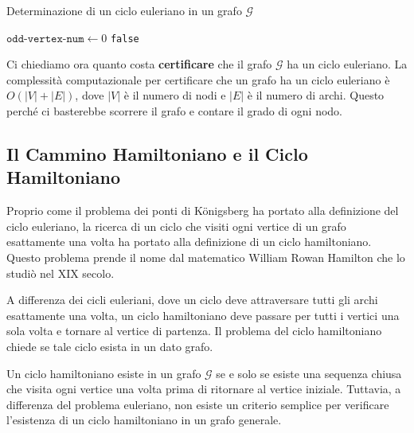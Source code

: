 \begin{algorithm}[H]
    \SetAlgoLined
    
    \DontPrintSemicolon
    \caption{Determinazione di un ciclo euleriano in un grafo $\mathcal{G}$}
    \label{alg:eulero_algo}
    
    
    \BlankLine
    $\texttt{odd-vertex-num} \gets 0$\;
    \Return \texttt{false}\;
\end{algorithm}

Ci chiediamo ora quanto costa \textbf{certificare} che il grafo $\mathcal{G}$
ha un ciclo euleriano.
La complessità computazionale per certificare che un grafo ha un ciclo
euleriano è $O(|V|+|E|)$, dove $|V|$ è il numero di nodi e $|E|$ è il numero di archi.
Questo perché ci basterebbe scorrere il grafo e contare il grado di ogni nodo.

\subsection{Il Cammino Hamiltoniano e il Ciclo Hamiltoniano}
Proprio come il problema dei ponti di Königsberg ha portato alla definizione del ciclo
euleriano, la ricerca di un ciclo che visiti ogni vertice di un grafo esattamente
una volta ha portato alla definizione di un ciclo hamiltoniano. Questo problema
prende il nome dal matematico William Rowan Hamilton che lo studiò nel XIX secolo.

A differenza dei cicli euleriani, dove un ciclo deve attraversare tutti gli archi
esattamente una volta, un ciclo hamiltoniano deve passare per tutti i vertici una
sola volta e tornare al vertice di partenza. Il problema del ciclo hamiltoniano
chiede se tale ciclo esista in un dato grafo.

\begin{tcolorbox}[title=Problema del Ciclo Hamiltoniano]
    Un ciclo hamiltoniano esiste in un grafo $\mathcal{G}$ se e solo se esiste una
    sequenza chiusa che
    visita ogni vertice una volta prima di ritornare al vertice iniziale. Tuttavia, a
    differenza del problema euleriano, non esiste un criterio semplice per verificare
    l'esistenza di un ciclo hamiltoniano in un grafo generale.
\end{tcolorbox}

